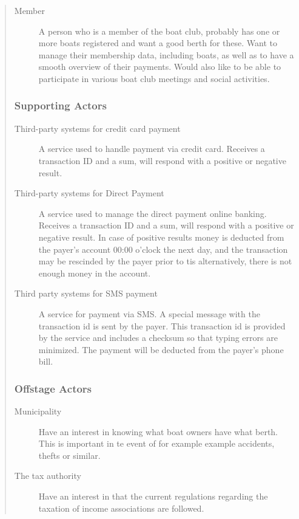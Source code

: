 \begin{quote}
\begin{description}
  \item[Member]
  A person who is a member of the boat club, probably has one or more boats
  registered and want a good berth for these. Want to manage their membership
  data, including boats, as well as to have a smooth overview of their
  payments.  Would also like to be able to participate in various boat club
  meetings and social activities.
\end{description}


\subsubsection{Supporting Actors}
\begin{description}
  \item[Third-party systems for credit card payment]
  A service used to handle payment via credit card. Receives a transaction ID
  and a sum, will respond with a positive or negative result.

  \item[Third-party systems for Direct Payment]
  A service used to manage the direct payment online banking. Receives a
  transaction ID and a sum, will respond with a positive or negative result.
  In case of positive results money is deducted from the payer's account 00:00
  o'clock the next day, and the transaction may be rescinded by the payer prior
  to tis alternatively, there is not enough money in the account.
  
  \item[Third party systems for SMS payment]
  A service for payment via SMS. A special message with the transaction id is
  sent by the payer. This transaction id is provided by the service and
  includes a checksum so that typing errors are minimized.
  The payment will be deducted from the payer's phone bill.
\end{description}


\subsubsection{Offstage Actors}
\begin{description}
  \item[Municipality]
  Have an interest in knowing what boat owners have what berth. This is
  important in te event of for example example accidents, thefts or similar.
  
  \item[The tax authority]
  Have an interest in that the current regulations regarding the taxation of
  income associations are followed.
\end{description}




\end{quote}

